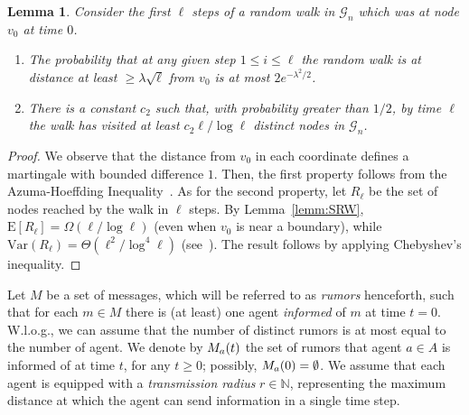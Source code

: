\documentclass[11pt]{article}
\newcommand{\newterm}[1]{\emph{#1}}
\newcommand{\bigTh}[1]{\Theta\left(#1\right)}
\newcommand{\bigOm}[1]{\Omega\left(#1\right)}
\newcommand{\expe}[1]{\mathrm{E}\left[{#1}\right]}
\newcommand{\vari}[1]{\mathrm{Var}\left({#1}\right)}
\newcommand{\N}{\mathbb{N}}
\newcommand{\grid}{\mathcal{G}_n}
\newtheorem{lemm}{Lemma}
\begin{document}
\begin{lemm}
\label{lemm:props}
Consider the first $\ell$ steps of a random walk in $\grid$ which was at
node $v_0$ at time $0$.
\begin{enumerate}
\item\label{poin:dev} 
The probability that at any given step $1\leq i\leq \ell$ the random
walk is at distance at least $\geq \lambda\sqrt{\ell}$ from $v_0$ is
at most $2 e^{-\lambda^2/2}$.
\item\label{poin:range} 
There is a constant $c_2$ such that, with probability greater than
$1/2$, by time $\ell$ the walk has visited at least $c_2\ell/\log
{\ell}$ distinct nodes in $\grid$.
\end{enumerate}
\end{lemm}
\begin{proof}
We observe that the distance from $v_0$ in each coordinate defines a
martingale with bounded difference $1$.  Then, the first property
follows from the Azuma-Hoeffding Inequality~\cite[Theorem 2.6]{MitzenmacherU05}.
As for the second property, let $R_\ell$ be
the set of nodes reached by the walk in $\ell$ steps.  By
Lemma~\ref{lemm:SRW}, $\expe{R_\ell}=\bigOm{{\ell}/{\log \ell}}$ (even
when $v_0$ is near a boundary), while
$\vari{R_\ell}=\bigTh{{\ell^2}/{\log^4 \ell}}$
(see~\cite{Torney86}). The result follows by applying Chebyshev's
inequality.
\end{proof}

Let $M$ be a set of messages, which will be referred to as
\newterm{rumors} henceforth, such that for each $m \in M$ there is (at
least) one agent \newterm{informed} of $m$ at time $t=0$.  W.l.o.g.,
we can assume that the number of distinct rumors is at most equal to
the number of agent.  We denote by $M_{a}(t)$ the set of rumors that
agent $a \in A$ is informed of at time $t$, for any $t \geq 0$;
possibly, $M_{a}(0) = \emptyset$.  We assume that each agent is
equipped with a \newterm{transmission radius} $r \in \N$, representing
the maximum distance at which the agent can send information in a
single time step.
\end{document}
